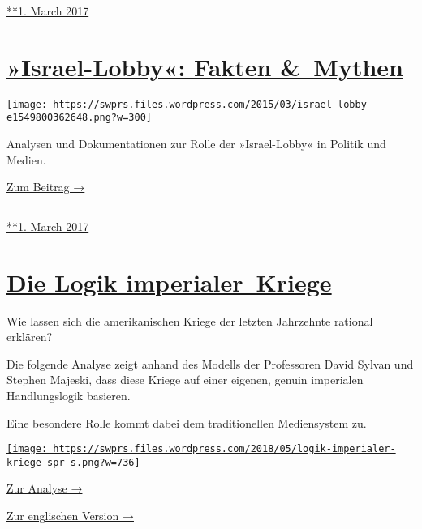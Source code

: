 \href{https://swprs.org/2017/03/01/die-republik-und-das-imperium/}{**1.
March 2017}

\hypertarget{israel-lobby-fakten--mythen}{%
\section{\texorpdfstring{\href{https://swprs.org/2017/03/01/die-israel-lobby-fakten-und-mythen/}{»Israel-Lobby«:
Fakten
\&~Mythen}}{»Israel-Lobby«: Fakten \&~Mythen}}\label{israel-lobby-fakten--mythen}}

\href{https://swprs.org/2017/03/01/die-israel-lobby-fakten-und-mythen/}{\texttt{[image: https://swprs.files.wordpress.com/2015/03/israel-lobby-e1549800362648.png?w=300]}}

Analysen und Dokumentationen zur Rolle der »Israel-Lobby« in Politik und
Medien.

\href{https://swprs.org/die-israel-lobby-fakten-und-mythen/}{Zum Beitrag
→}

\begin{center}\rule{0.5\linewidth}{\linethickness}\end{center}

\href{https://swprs.org/2017/03/01/die-israel-lobby-fakten-und-mythen/}{**1.
March 2017}

\hypertarget{die-logik-imperialer-kriege}{%
\section{\texorpdfstring{\href{https://swprs.org/2017/03/01/die-logik-imperialer-kriege/}{Die
Logik
imperialer~Kriege}}{Die Logik imperialer~Kriege}}\label{die-logik-imperialer-kriege}}

Wie lassen sich die amerikanischen Kriege der letzten Jahrzehnte
rational erklären?

Die folgende Analyse zeigt anhand des Modells der Professoren David
Sylvan und Stephen Majeski, dass diese Kriege auf einer eigenen, genuin
imperialen Handlungslogik basieren.

Eine besondere Rolle kommt dabei dem traditionellen Mediensystem zu.

\href{https://swprs.org/logik-imperialer-kriege/}{\texttt{[image: https://swprs.files.wordpress.com/2018/05/logik-imperialer-kriege-spr-s.png?w=736]}}

\href{https://swprs.org/logik-imperialer-kriege/}{Zur Analyse →}

\href{https://swprs.org/us-foreign-policy/}{Zur englischen Version →}

